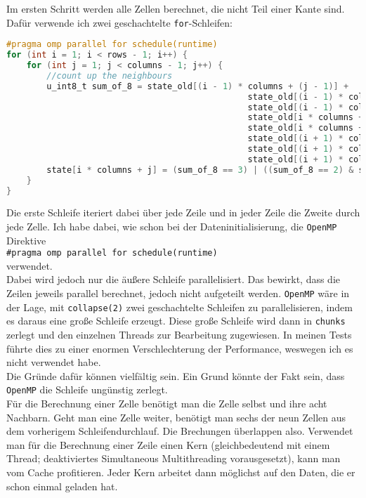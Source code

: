 \documentclass[german,plainarticle,hyperref,utf8]{zihpub}
\begin{document}
	Im ersten Schritt werden alle Zellen berechnet, die nicht Teil einer Kante sind. Dafür verwende ich zwei geschachtelte \texttt{for}-Schleifen:\\
	\begin{lstlisting}[language=C, caption=Berechnung der inneren Zellen]
#pragma omp parallel for schedule(runtime)
for (int i = 1; i < rows - 1; i++) {
	for (int j = 1; j < columns - 1; j++) {
		//count up the neighbours
		u_int8_t sum_of_8 = state_old[(i - 1) * columns + (j - 1)] +
												state_old[(i - 1) * columns + j] +
												state_old[(i - 1) * columns + (j + 1)] +
												state_old[i * columns + (j - 1)] +
												state_old[i * columns + (j + 1)] +
												state_old[(i + 1) * columns + (j - 1)] +
												state_old[(i + 1) * columns + j] +
												state_old[(i + 1) * columns + (j + 1)];
		state[i * columns + j] = (sum_of_8 == 3) | ((sum_of_8 == 2) & state_old[i * columns + j]);
	}
}\end{lstlisting}
	
	Die erste Schleife iteriert dabei über jede Zeile und in jeder Zeile die Zweite durch jede Zelle. Ich habe dabei, wie schon bei der Dateninitialisierung, die \texttt{OpenMP} Direktive\\
	
	\texttt{\#pragma omp parallel for schedule(runtime)}\\
	
	verwendet.\\
	Dabei wird jedoch nur die äußere Schleife parallelisiert. Das bewirkt, dass die Zeilen jeweils parallel berechnet, jedoch nicht aufgeteilt werden. \texttt{OpenMP} wäre in der Lage, mit \texttt{collapse(2)} zwei geschachtelte Schleifen zu parallelisieren, indem es daraus eine große Schleife erzeugt. Diese große Schleife wird dann in \texttt{chunks} zerlegt und den einzelnen Threads zur Bearbeitung zugewiesen. In meinen Tests führte dies zu einer enormen Verschlechterung der Performance, weswegen ich es nicht verwendet habe.\\
	
	Die Gründe dafür können vielfältig sein. Ein Grund könnte der Fakt sein, dass \texttt{OpenMP} die Schleife ungünstig zerlegt.\\
	Für die Berechnung einer Zelle benötigt man die Zelle selbst und ihre acht Nachbarn. Geht man eine Zelle weiter, benötigt man sechs der neun Zellen aus dem vorherigem Schleifendurchlauf. Die Brechungen überlappen also. Verwendet man für die Berechnung einer Zeile einen Kern (gleichbedeutend mit einem Thread; deaktiviertes Simultaneous Multithreading vorausgesetzt), kann man vom Cache profitieren. Jeder Kern arbeitet dann möglichst auf den Daten, die er schon einmal geladen hat.\\
	
\end{document}
